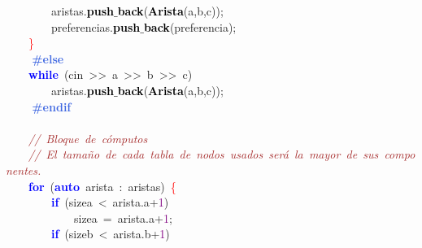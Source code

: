 \mbox{}\ \ \ \ \ \ \ \ aristas\textcolor{BrickRed}{.}\textbf{\textcolor{Black}{push$\_$back}}\textcolor{BrickRed}{(}\textbf{\textcolor{Black}{Arista}}\textcolor{BrickRed}{(}a\textcolor{BrickRed}{,}b\textcolor{BrickRed}{,}c\textcolor{BrickRed}{));} \\
\mbox{}\ \ \ \ \ \ \ \ preferencias\textcolor{BrickRed}{.}\textbf{\textcolor{Black}{push$\_$back}}\textcolor{BrickRed}{(}preferencia\textcolor{BrickRed}{);} \\
\mbox{}\ \ \ \ \textcolor{Red}{\}} \\
\mbox{}\textbf{\textcolor{RoyalBlue}{\ \ \ \ \#else}} \\
\mbox{}\ \ \ \ \textbf{\textcolor{Blue}{while}}\ \textcolor{BrickRed}{(}cin\ \textcolor{BrickRed}{\textgreater{}\textgreater{}}\ a\ \textcolor{BrickRed}{\textgreater{}\textgreater{}}\ b\ \textcolor{BrickRed}{\textgreater{}\textgreater{}}\ c\textcolor{BrickRed}{)} \\
\mbox{}\ \ \ \ \ \ \ \ aristas\textcolor{BrickRed}{.}\textbf{\textcolor{Black}{push$\_$back}}\textcolor{BrickRed}{(}\textbf{\textcolor{Black}{Arista}}\textcolor{BrickRed}{(}a\textcolor{BrickRed}{,}b\textcolor{BrickRed}{,}c\textcolor{BrickRed}{));} \\
\mbox{}\textbf{\textcolor{RoyalBlue}{\ \ \ \ \#endif}} \\
\mbox{} \\
\mbox{}\ \ \ \ \textit{\textcolor{Brown}{//\ Bloque\ de\ cómputos}} \\
\mbox{}\ \ \ \ \textit{\textcolor{Brown}{//\ El\ tamaño\ de\ cada\ tabla\ de\ nodos\ usados\ será\ la\ mayor\ de\ sus\ componentes.}} \\
\mbox{}\ \ \ \ \textbf{\textcolor{Blue}{for}}\ \textcolor{BrickRed}{(}\textbf{\textcolor{Blue}{auto}}\ arista\ \textcolor{BrickRed}{:}\ aristas\textcolor{BrickRed}{)}\ \textcolor{Red}{\{} \\
\mbox{}\ \ \ \ \ \ \ \ \textbf{\textcolor{Blue}{if}}\ \textcolor{BrickRed}{(}sizea\ \textcolor{BrickRed}{\textless{}}\ arista\textcolor{BrickRed}{.}a\textcolor{BrickRed}{+}\textcolor{Purple}{1}\textcolor{BrickRed}{)} \\
\mbox{}\ \ \ \ \ \ \ \ \ \ \ \ sizea\ \textcolor{BrickRed}{=}\ arista\textcolor{BrickRed}{.}a\textcolor{BrickRed}{+}\textcolor{Purple}{1}\textcolor{BrickRed}{;} \\
\mbox{}\ \ \ \ \ \ \ \ \textbf{\textcolor{Blue}{if}}\ \textcolor{BrickRed}{(}sizeb\ \textcolor{BrickRed}{\textless{}}\ arista\textcolor{BrickRed}{.}b\textcolor{BrickRed}{+}\textcolor{Purple}{1}\textcolor{BrickRed}{)} \\
